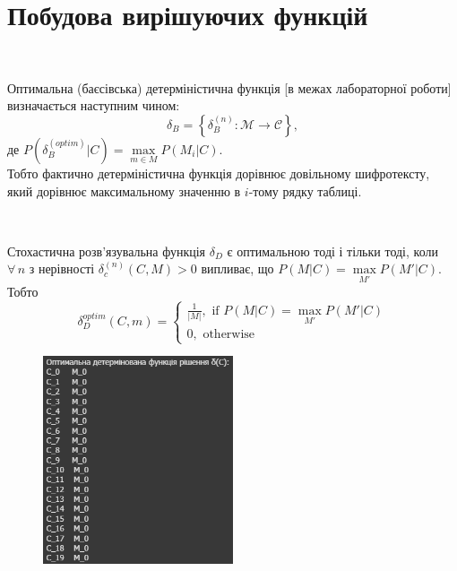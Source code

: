 \section{Побудова вирішуючих функцій}
\begin{definition}    
    ~\par Оптимальна (баєсівська) детерміністична функція [в межах лабораторної роботи] визначається наступним чином: 
    \begin{equation*}
        \delta_{B} = \left\{\delta_{B}^{(n)} : \mathcal{M} \rightarrow \mathcal{C}\right\}, 
    \end{equation*}
    де $P \left(\delta_{B}^{(optim)} \vert C\right) = \max\limits_{m \in M} P \left(M_{i} \vert C\right)$. \\ 
    Тобто фактично детерміністична функція дорівнює довільному шифротексту, який дорівнює максимальному значенню в 
    $i$-тому рядку таблиці.
\end{definition}
\begin{definition}
    ~\par Стохастична розв'язувальна функція $\delta_{D}$ є оптимальною тоді і тільки тоді, коли $\forall \, n$ 
    з нерівності $\delta_{c}^{(n)} \left(C, M\right) > 0$ випливає, що $P \left(M \vert C\right) = \max\limits_{M'} P \left(M' \vert C\right)$.
    Тобто 
    \begin{equation*}
        \delta_{D}^{optim} \left(C, m\right) = 
        \begin{cases}
            \frac{1}{\vert M \vert}, \text{ if } P \left(M \vert C\right) = \max\limits_{M'} P \left(M' \vert C\right) \\
            0, \text{ otherwise}
        \end{cases}
    \end{equation*}
\end{definition}
\newpage

\begin{figure}[!ht]
    \centering
    \begin{minipage}{0.85\linewidth}
        \includegraphics[width=0.5\textwidth, scale=0.2]{ReportPic/report_4.png}
    \end{minipage}
\end{figure}

